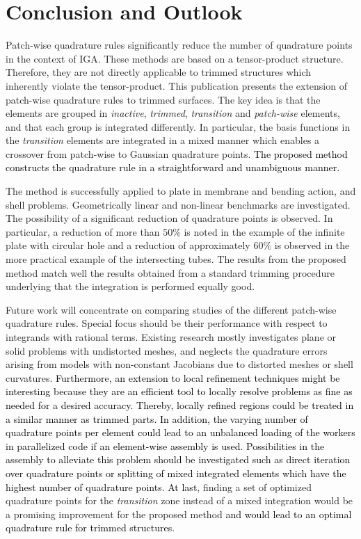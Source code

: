 \documentclass[3p]{elsarticle}
\newcommand{\reviewed}{\textcolor{black}}	%
\begin{document}
\section{Conclusion and Outlook}\label{sec:conclusion}
Patch-wise quadrature rules significantly reduce the number of quadrature points in the context of IGA. These methods are based on a tensor-product structure. Therefore, they are not directly applicable to trimmed structures which inherently violate the tensor-product. This publication presents the extension of patch-wise quadrature rules to trimmed surfaces. The key idea is that the elements are grouped in \textit{inactive}, \textit{trimmed}, \textit{transition} and \textit{patch-wise} elements, and that each group is integrated differently. In particular, the basis functions in the \textit{transition} elements are integrated in a mixed manner which enables a crossover from patch-wise to Gaussian quadrature points. \reviewed{The proposed method constructs the quadrature rule in a straightforward and unambiguous manner.} \bigskip

The method is successfully applied to plate in membrane and bending action, and shell problems. Geometrically linear and non-linear benchmarks are investigated. The possibility of a significant reduction of quadrature points is observed. In particular, a reduction of more than $50\%$ is noted in the example of the infinite plate with circular hole and a reduction of approximately $60\%$ is observed in the more practical example of the intersecting tubes. The results from the proposed method match well the results obtained from a standard trimming procedure underlying that the integration is performed equally good. \bigskip

Future work will concentrate on comparing studies of the different patch-wise quadrature rules. Special focus should be their performance with respect to integrands with rational terms. Existing research mostly investigates plane or solid problems with undistorted meshes, and neglects the quadrature errors arising from models with non-constant Jacobians due to distorted meshes or shell curvatures. \reviewed{Furthermore, an extension to local refinement techniques might be interesting because they are an efficient tool to locally resolve problems as fine as needed for a desired accuracy. Thereby, locally refined regions could be treated in a similar manner as trimmed parts. In addition, the varying number of quadrature points per element could lead to an unbalanced loading of the workers in parallelized code if an element-wise assembly is used. Possibilities in the assembly to alleviate this problem should be investigated such as direct iteration over quadrature points or splitting of mixed integrated elements which have the highest number of quadrature points. At last}, finding a set of optimized quadrature points for the \textit{transition} zone instead of a mixed integration would be a promising improvement for the proposed method \reviewed{and would lead to an optimal quadrature rule for trimmed structures}.
\end{document}

